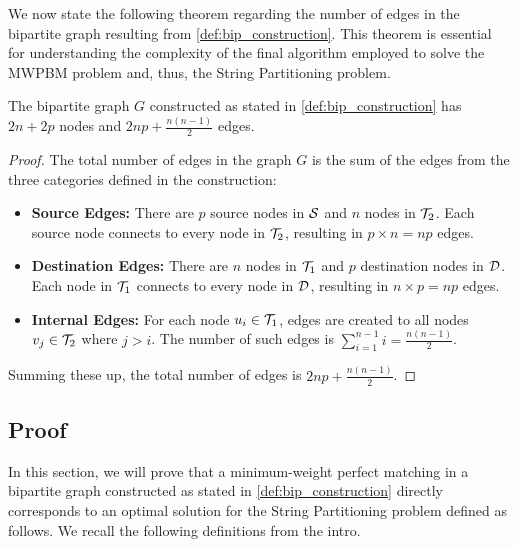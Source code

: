 We now state the following theorem regarding the number of edges in the bipartite graph resulting from \cref{def:bip_construction}. This theorem is essential for understanding the complexity of the final algorithm employed to solve the MWPBM problem and, thus, the String Partitioning problem.

\begin{lemma} \label{thm:bip_graph_properties}
    The bipartite graph $G$ constructed as stated in \cref{def:bip_construction} has $2n + 2p$ nodes and $2np + \frac{n(n-1)}{2}$ edges.
\end{lemma}

\begin{proof}
    The total number of edges in the graph $G$ is the sum of the edges from the three categories defined in the construction:
    \begin{itemize}[leftmargin=25pt]
        \item \textbf{Source Edges:} There are $p$ source nodes in $\mathcal{S}$ and $n$ nodes in $\mathcal{T}_{2}$. Each source node connects to every node in $\mathcal{T}_{2}$, resulting in $p \times n = np$ edges.

        \item \textbf{Destination Edges:} There are $n$ nodes in $\mathcal{T}_{1}$ and $p$ destination nodes in $\mathcal{D}$. Each node in $\mathcal{T}_{1}$ connects to every node in $\mathcal{D}$, resulting in $n \times p = np$ edges.

        \item \textbf{Internal Edges:} For each node $u_i \in \mathcal{T}_{1}$, edges are created to all nodes $v_j \in \mathcal{T}_{2}$ where $j > i$. The number of such edges is $\sum_{i=1}^{n-1} i = \frac{n(n-1)}{2}$.
    \end{itemize}

    Summing these up, the total number of edges is $2np + \frac{n(n-1)}{2}$.
\end{proof}

\subsection{Proof}
In this section, we will prove that a minimum-weight perfect matching in a bipartite graph constructed as stated in \cref{def:bip_construction} directly corresponds to an optimal solution for the String Partitioning problem defined as follows. We recall the following definitions from the intro.

\rundef*

